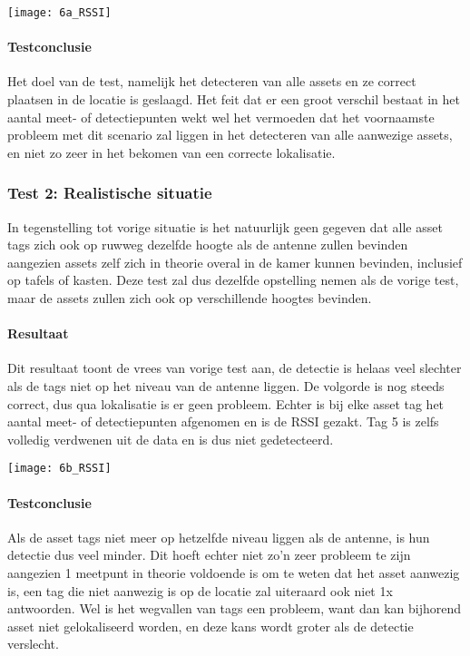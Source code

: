 \texttt{[image: 6a\_RSSI]}

\paragraph{Testconclusie}
Het doel van de test, namelijk het detecteren van alle assets en ze correct plaatsen in de locatie is geslaagd. Het feit dat er een groot verschil bestaat in het aantal meet- of detectiepunten wekt wel het vermoeden dat het voornaamste probleem met dit scenario zal liggen in het detecteren van alle aanwezige assets, en niet zo zeer in het bekomen van een correcte lokalisatie.

\subsubsection{Test 2: Realistische situatie}
In tegenstelling tot vorige situatie is het natuurlijk geen gegeven dat alle asset tags zich ook op ruwweg dezelfde hoogte als de antenne zullen bevinden aangezien assets zelf zich in theorie overal in de kamer kunnen bevinden, inclusief op tafels of kasten. Deze test zal dus dezelfde opstelling nemen als de vorige test, maar de assets zullen zich ook op verschillende hoogtes bevinden.

\paragraph{Resultaat}
Dit resultaat toont de vrees van vorige test aan, de detectie is helaas veel slechter als de tags niet op het niveau van de antenne liggen. De volgorde is nog steeds correct, dus qua lokalisatie is er geen probleem. Echter is bij elke asset tag het aantal meet- of detectiepunten afgenomen en is de RSSI gezakt. Tag 5 is zelfs volledig verdwenen uit de data en is dus niet gedetecteerd.

\texttt{[image: 6b\_RSSI]}

\paragraph{Testconclusie}
Als de asset tags niet meer op hetzelfde niveau liggen als de antenne, is hun detectie dus veel minder. Dit hoeft echter niet zo'n zeer probleem te zijn aangezien 1 meetpunt in theorie voldoende is om te weten dat het asset aanwezig is, een tag die niet aanwezig is op de locatie zal uiteraard ook niet 1x antwoorden. Wel is het wegvallen van tags een probleem, want dan kan bijhorend asset niet gelokaliseerd worden, en deze kans wordt groter als de detectie verslecht.

